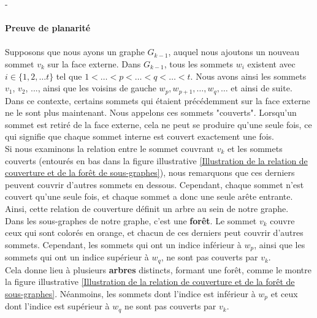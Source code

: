 \documentclass[hidelinks,letterpaper,12pt]{article}
\begin{document}
{\color{white}-}
\\ \\
\textbf{Preuve de planarité}
\\ \\
Supposons que nous ayons un graphe $G_{k-1}$, auquel nous ajoutons un nouveau sommet $v_{k}$ sur la face externe. Dans $G_{k-1}$, tous les sommets $w_i$ existent avec \( i \in \{1, 2, \dots  t\} \) tel que \(  1 < \dots < p < \dots < q < \dots < t \). Nous avons ainsi les sommets $v_1$, $v_2$, ..., ainsi que les voisins de gauche \(  w_p, w_{p+1},\dots,w_q,\dots \) et ainsi de suite.
\\
Dans ce contexte, certains sommets qui étaient précédemment sur la face externe ne le sont plus maintenant. Nous appelons ces sommets "couverts". Lorsqu'un sommet est retiré de la face externe, cela ne peut se produire qu'une seule fois, ce qui signifie que chaque sommet interne est couvert exactement une fois.
\\
Si nous examinons la relation entre le sommet couvrant $v_{k}$ et les sommets couverts (entourés en bas dans la figure illustrative \ref{Illustration de la relation de couverture et de la forêt de sous-graphes}), nous remarquons que ces derniers peuvent couvrir d'autres sommets en dessous. Cependant, chaque sommet n'est couvert qu'une seule fois, et chaque sommet a donc une seule arête entrante. Ainsi, cette relation de couverture définit un arbre au sein de notre graphe.
\\
Dans les sous-graphes de notre graphe, c'est une \textbf{forêt}. Le sommet $v_{k}$ couvre ceux qui sont colorés en orange, et chacun de ces derniers peut couvrir d'autres sommets. Cependant, les sommets qui ont un indice inférieur à $w_p$, ainsi que les sommets qui ont un indice supérieur à $w_{q}$, ne sont pas couverts par $v_{k}$.
\\
Cela donne lieu à plusieurs \textbf{arbres} distincts, formant une forêt, comme le montre la figure illustrative \ref{Illustration de la relation de couverture et de la forêt de sous-graphes}. Néanmoins, les sommets dont l'indice est inférieur à $w_{p}$ et ceux dont l'indice est supérieur à $w_{q}$ ne sont pas couverts par $v_{k}$.
\\
\end{document}

